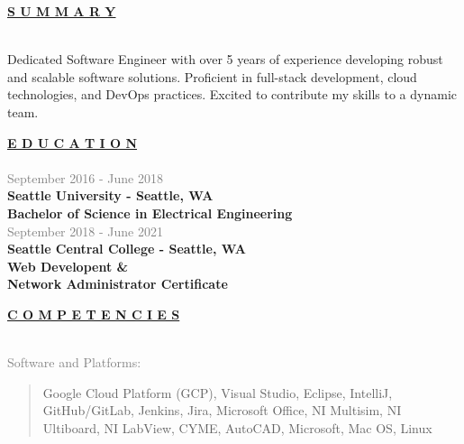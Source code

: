 \documentclass[letterpage]{article}
\begin{document}
\textbf{\fontsize{14px}{-1px}\selectfont
  \ul{S U M M A R Y}
}\\
\vspace{7px}\\
\begin{large}
Dedicated Software Engineer with over 5 years of experience developing robust and scalable software solutions.  Proficient in full-stack development, cloud technologies, and DevOps practices. Excited to contribute my skills to a dynamic team.
\end{large}


\begin{minipage}[t]{0.424\linewidth}
\vspace{3pt}
\textbf{\fontsize{14px}{1px}\selectfont
  \ul{E D U C A T I O N}
}\\
\vspace{5px}\\
\textcolor{gray}{September 2016 - June 2018}\\
\textbf{\textsf{Seattle University - Seattle, WA}}\\
\textbf{Bachelor of Science in Electrical Engineering}\\

\textcolor{gray}{September 2018 - June 2021}\\
\textbf{\textsf{Seattle Central College - Seattle, WA}}\\
\textbf{Web Developent \& }\\
\textbf{Network Administrator Certificate}\\
\vspace{8px}

\textbf{\fontsize{14px}{1px}\selectfont
  \ul{C O M P E T E N C I E S}
}\\
\vspace{-5px}\\
\begin{minipage}[t]{0.01\linewidth}
  \end{minipage}
  \: %

  \vspace{1px}
  \textcolor{gray}{Software and Platforms:}\\
  \begin{quote}
      \textmd{Google Cloud Platform (GCP), Visual Studio, Eclipse, IntelliJ, GitHub/GitLab, Jenkins, Jira, Microsoft Office, NI
      Multisim, NI Ultiboard, NI LabView, CYME, AutoCAD, Microsoft, Mac OS,
      Linux}\\
  \end{quote}


\end{minipage}
\end{document}
